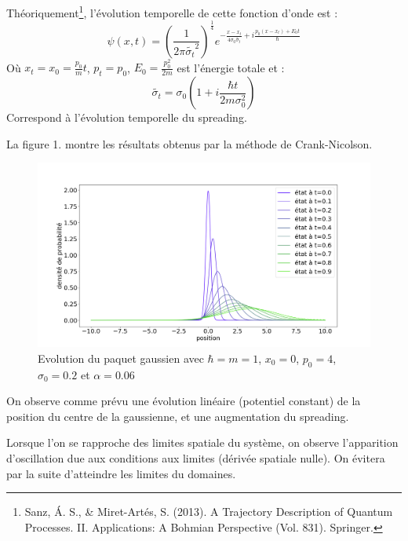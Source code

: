\documentclass[11pt, a4paper, twocolumn]{article}
\begin{document}
Théoriquement\footnote{Sanz, Á. S., \& Miret-Artés, S. (2013). A Trajectory Description of Quantum Processes. II. Applications: A Bohmian Perspective (Vol. 831). Springer.}, l'évolution temporelle de cette fonction d'onde est :
\begin{equation}
	\psi(x, t) = \left(\frac{1}{2\pi\tilde{\sigma_t}^2}\right)^{\frac{1}{4}}e^{-\frac{x-x_t}{4\sigma_0\tilde{\sigma_t}}+i\frac{p_0(x-x_t)+E_0t}{\hbar}}
\end{equation}
Où $x_t = x_0 = \frac{p_0}{m}t$, $p_t = p_0$, $E_0 = \frac{p_0^2}{2m}$ est l'énergie totale et :
\begin{equation}
	\tilde{\sigma_t} = \sigma_0\left(1+i\frac{\hbar t}{2m\sigma_0^2}\right)
\end{equation}
Correspond à l'évolution temporelle du spreading.

La figure 1. montre les résultats obtenus par la méthode de Crank-Nicolson.
\begin{figure}
\includegraphics[width=\linewidth]{Figure_1.png}
\caption{Evolution du paquet gaussien avec $\hbar = m = 1$, $x_0 = 0$, $p_0 = 4$, $\sigma_0 = 0.2$ et $\alpha = 0.06$}
\end{figure}
On observe comme prévu une évolution linéaire (potentiel constant) de la position du centre de la gaussienne, et une augmentation du spreading.

Lorsque l'on se rapproche des limites spatiale du système, on observe l'apparition d'oscillation due aux conditions aux limites (dérivée spatiale nulle). On évitera par la suite d'atteindre les limites du domaines.
\end{document}

